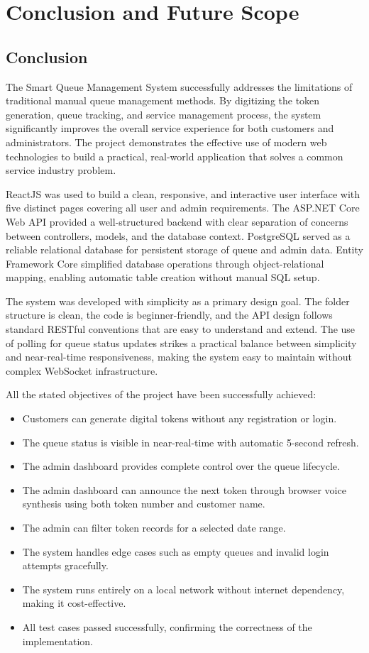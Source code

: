 
\chapter{Conclusion and Future Scope}

\section{Conclusion}

The Smart Queue Management System successfully addresses the limitations of traditional manual queue management methods. By digitizing the token generation, queue tracking, and service management process, the system significantly improves the overall service experience for both customers and administrators. The project demonstrates the effective use of modern web technologies to build a practical, real-world application that solves a common service industry problem.

ReactJS was used to build a clean, responsive, and interactive user interface with five distinct pages covering all user and admin requirements. The ASP.NET Core Web API provided a well-structured backend with clear separation of concerns between controllers, models, and the database context. PostgreSQL served as a reliable relational database for persistent storage of queue and admin data. Entity Framework Core simplified database operations through object-relational mapping, enabling automatic table creation without manual SQL setup.

The system was developed with simplicity as a primary design goal. The folder structure is clean, the code is beginner-friendly, and the API design follows standard RESTful conventions that are easy to understand and extend. The use of polling for queue status updates strikes a practical balance between simplicity and near-real-time responsiveness, making the system easy to maintain without complex WebSocket infrastructure.

All the stated objectives of the project have been successfully achieved:
\begin{itemize}
    \item Customers can generate digital tokens without any registration or login.
    \item The queue status is visible in near-real-time with automatic 5-second refresh.
    \item The admin dashboard provides complete control over the queue lifecycle.
    \item The admin dashboard can announce the next token through browser voice synthesis using both token number and customer name.
    \item The admin can filter token records for a selected date range.
    \item The system handles edge cases such as empty queues and invalid login attempts gracefully.
    \item The system runs entirely on a local network without internet dependency, making it cost-effective.
    \item All test cases passed successfully, confirming the correctness of the implementation.
\end{itemize}

